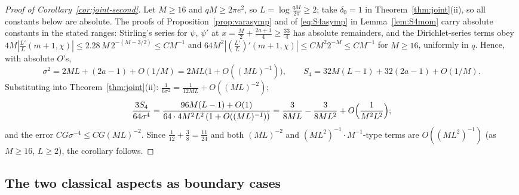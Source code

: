 \begin{proof}[Proof of Corollary~\ref{cor:joint-second}]
Let $M\ge16$ and $qM\ge2\pi e^2$, so $L=\log\tfrac{qM}{2\pi}\ge2$; take
$\delta_0=1$ in Theorem~\ref{thm:joint}(ii), so all constants below
are absolute. The proofs of Proposition~\ref{prop:varasymp} and of
\eqref{eq:S4asymp} in Lemma~\ref{lem:S4mom} carry absolute constants
in the stated ranges: Stirling's series for $\psi$, $\psi'$ at
$x=\tfrac M2+\tfrac{2a+1}4\ge\tfrac{33}4$ has absolute remainders, and
the Dirichlet-series terms obey
$4M|\tfrac{L'}L(m+1,\chi)|\le2.28\,M\,2^{-(M-3/2)}\le CM^{-1}$ and
$64M^2|(\tfrac{L'}L)'(m+1,\chi)|\le CM^{2}2^{-M}\le CM^{-1}$ for
$M\ge16$, uniformly in $q$. Hence, with absolute $O$'s,
\[
\sigma^2=2ML+(2a-1)+O(1/M)=2ML\bigl(1+O((ML)^{-1})\bigr),
\qquad
S_4=32M(L-1)+32(2a-1)+O(1/M).
\]
Substituting into Theorem~\ref{thm:joint}(ii):
$\tfrac1{6\sigma^2}=\tfrac1{12ML}+O((ML)^{-2})$;
\[
\frac{3S_4}{64\sigma^4}
=\frac{96M(L-1)+O(1)}{64\cdot4M^2L^2\,(1+O((ML)^{-1}))}
=\frac{3}{8ML}-\frac{3}{8ML^2}+O\Bigl(\frac1{M^2L^2}\Bigr);
\]
and the error $CG\sigma^{-4}\le CG(ML)^{-2}$. Since
$\tfrac1{12}+\tfrac38=\tfrac{11}{24}$ and both $(ML)^{-2}$ and
$(ML^2)^{-1}\cdot M^{-1}$-type terms are $O((ML^2)^{-1})$ (as
$M\ge16$, $L\ge2$), the corollary follows.
\end{proof}

\subsection*{The two classical aspects as boundary cases}

